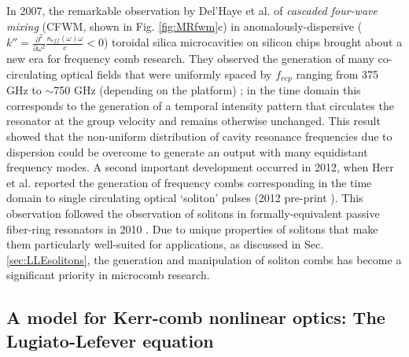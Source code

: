 In 2007, the remarkable observation by Del'Haye et al. of \textit{cascaded four-wave mixing} (CFWM, shown in Fig. \ref{fig:MRfwm}c) in anomalously-dispersive ($k''=\frac{\partial^2}{\partial\omega^2}\frac{n_{eff}(\omega)\omega}{c}<0$) toroidal silica microcavities on silicon chips brought about a new era for frequency comb research. They observed the generation of many co-circulating optical fields that were uniformly spaced by $f_{rep}$ ranging from 375 GHz to $\sim$750 GHz (depending on the platform) \cite{DelHaye2007}; in the time domain this corresponds to the generation of a temporal intensity pattern that circulates the resonator at the group velocity and remains otherwise unchanged. This result showed that the non-uniform distribution of cavity resonance frequencies due to dispersion could be overcome to generate an output with many equidistant frequency modes. A second important development occurred in 2012, when Herr et al. reported the generation of frequency combs corresponding in the time domain to single circulating optical `soliton' pulses \cite{Herr2014} (2012 pre-print \cite{Herr2012a}). This observation followed the observation of solitons in formally-equivalent passive fiber-ring resonators in 2010 \cite{Leo2010a}. Due to unique properties of solitons that make them particularly well-suited for applications, as discussed in Sec. \ref{sec:LLEsolitons}, the generation and manipulation of soliton combs has become a significant priority in microcomb research. 

\subsection{A model for Kerr-comb nonlinear optics: The Lugiato-Lefever equation}\label{sec:LLE}

